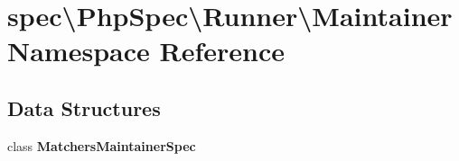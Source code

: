 \section{spec\textbackslash{}Php\+Spec\textbackslash{}Runner\textbackslash{}Maintainer Namespace Reference}
\label{namespacespec_1_1_php_spec_1_1_runner_1_1_maintainer}
\subsection*{Data Structures}
\begin{DoxyCompactItemize}
\item 
class {\bf Matchers\+Maintainer\+Spec}
\end{DoxyCompactItemize}
